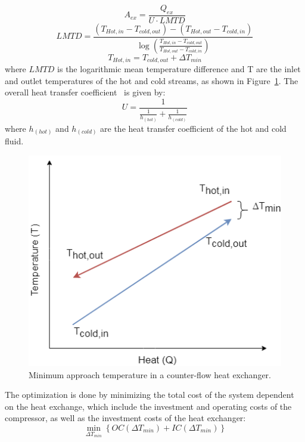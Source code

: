 \documentclass{article}
\begin{document}
\begin{equation}\label{eq:HEX_area}
A_{ex} = \frac{Q_{ex}}{U \cdot LMTD}
\end{equation}
\begin{equation}\label{eq:LMTD}
LMTD= \frac{(T_{Hot,in } - T_{cold,out }) - (T_{Hot,out } - T_{cold,in }) }{ \log{ (\frac{T_{Hot,in } - T_{cold,out }}{T_{Hot,out } - T_{cold,in }} ) }}
\end{equation}
\begin{equation}
	T_{Hot,in } = T_{cold,out} + \Delta T_{min}
\end{equation}
where  $LMTD$ is the logarithmic mean temperature difference and T are the inlet and outlet temperatures of the hot and cold streams, as shown in Figure~\ref{fig:dtmin}. The overall heat transfer coefficient~\cite{huExtremumSeekingControl2015} is given by:
\begin{equation}\label{eq:alpha}
U= \frac{1}{ \frac{1}{h_{(hot)} } + \frac{1}{h_{(cold)}} }
\end{equation}
where $h_{(hot)}$ and $h_{(cold)}$ are the heat transfer coefficient of the hot and cold fluid.

\begin{figure}[htp]
	\centering
	\includegraphics[scale=0.5]{Images/dtmin.png}
	\caption{Minimum approach temperature in a counter-flow heat exchanger.}
	\label{fig:dtmin}
\end{figure}

The optimization is done by minimizing the total cost of the system dependent on the heat exchange, which include the investment and operating costs of the compressor, as well as the investment costs of the heat exchanger:
\begin{equation}
	\min_{\Delta T_{min}}\left\lbrace OC(\Delta T_{min}) + IC(\Delta T_{min}) \right\rbrace 
\end{equation}
\end{document}
